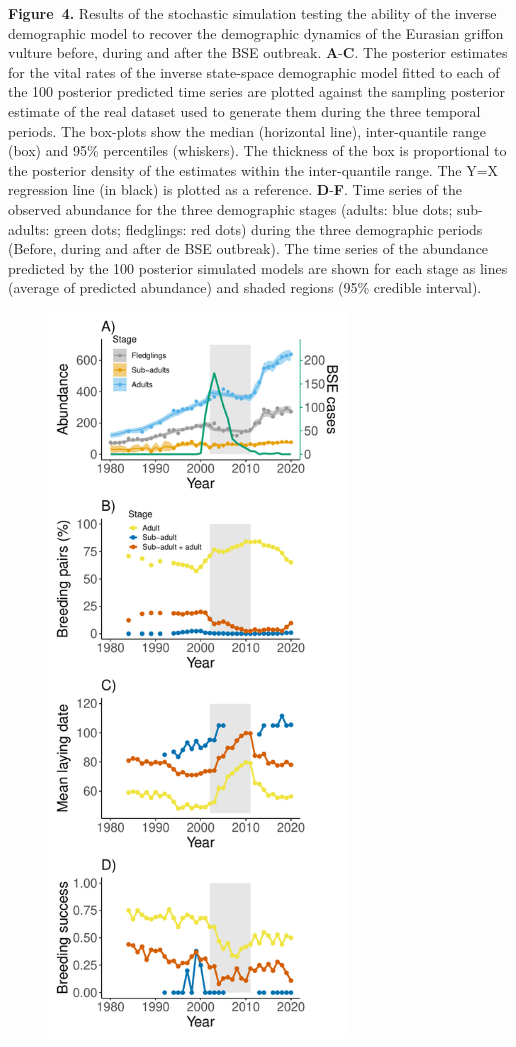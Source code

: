 \documentclass[12pt]{article}
\begin{document}
\noindent \textbf{Figure~4.} Results of the stochastic simulation testing the ability of the inverse demographic model to recover the demographic dynamics of the Eurasian griffon vulture before, during and after the BSE outbreak. \textbf{A}-\textbf{C}. The posterior estimates for the vital rates of the inverse state-space demographic model fitted to each of the 100 posterior predicted time series are plotted against the sampling posterior estimate of the real dataset used to generate them during the three temporal periods. The box-plots show the median (horizontal line), inter-quantile range (box) and 95\% percentiles (whiskers). The thickness of the box is proportional to the posterior density of the estimates within the inter-quantile range. The Y=X regression line (in black) is plotted as a reference. \textbf{D}-\textbf{F}. Time series of the observed abundance for the three demographic stages (adults: blue dots; sub-adults: green dots; fledglings: red dots) during the three demographic periods (Before, during and after de BSE outbreak). The time series of the abundance predicted by the 100 posterior simulated models are shown for each stage as lines (average of predicted abundance) and shaded regions (95\% credible interval). \\

\newpage
\begin{figure}[h!]
	\caption{}
	\label{Fig1}
	\begin{center}
		\includegraphics[width=8cm]{figs/Fig1.pdf}
	\end{center}
\end{figure}
\end{document}

